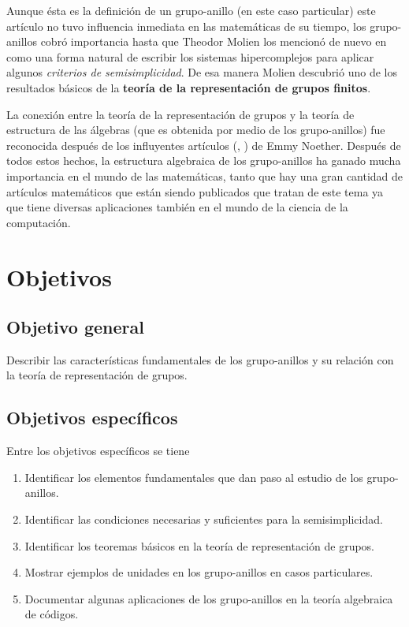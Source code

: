 \documentclass[12pt,letterpaper,titlepage]{article}
\begin{document}
Aunque ésta es la definición de un grupo-anillo (en este caso particular) este artículo no tuvo influencia inmediata en las matemáticas de su tiempo, los grupo-anillos cobró importancia  hasta que Theodor Molien los mencionó de nuevo en \cite{b8} como una forma natural de escribir los sistemas hipercomplejos para aplicar algunos \textit{criterios de semisimplicidad}. De esa manera Molien descubrió uno de los resultados básicos de la \textbf{teoría de la representación de grupos finitos}. \bigskip

La conexión entre la teoría de la representación de grupos y la teoría de estructura de las álgebras (que es obtenida por medio de los grupo-anillos) fue reconocida después de los influyentes artículos (\cite{b10}, \cite{b11}) de Emmy Noether. Después de todos estos hechos, la estructura algebraica de los grupo-anillos ha ganado mucha importancia en el mundo de las matemáticas, tanto que hay una gran cantidad de artículos matemáticos \cite[página 129]{b1} que están siendo publicados que tratan de este tema ya que tiene diversas aplicaciones también en el mundo de la ciencia de la computación. 

\newpage

\section{Objetivos}


\subsection{Objetivo general}
Describir las características fundamentales de los grupo-anillos y su  relación con la teoría de representación de grupos.

\subsection{Objetivos específicos}
Entre los objetivos específicos se tiene
\begin{enumerate}
\item Identificar los elementos fundamentales que dan paso al estudio de los grupo-anillos.
\item Identificar las condiciones necesarias y suficientes para la semisimplicidad.
\item Identificar los teoremas básicos en la teoría de representación de grupos. 
\item Mostrar ejemplos de unidades en los grupo-anillos en casos particulares.
\item Documentar algunas aplicaciones de los grupo-anillos en la teoría algebraica de códigos.
\end{enumerate}
\end{document}
